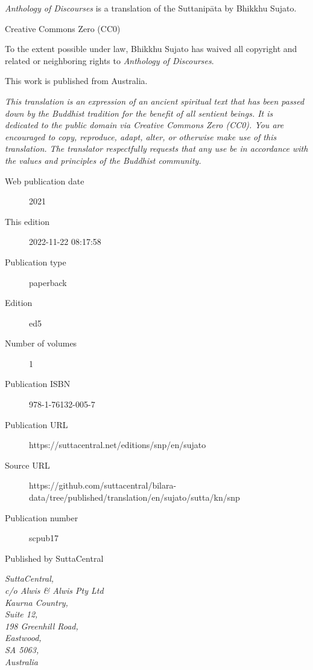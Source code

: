 \documentclass[12pt,openany]{book}%
\begin{document}
\begin{footnotesize}

\textit{Anthology of Discourses} is a translation of the Suttanipāta by Bhikkhu Sujato.

\medskip

Creative Commons Zero (CC0)

To the extent possible under law, Bhikkhu Sujato has waived all copyright and related or neighboring rights to \textit{Anthology of Discourses}.

\medskip

This work is published from Australia.

\begin{center}
\textit{This translation is an expression of an ancient spiritual text that has been passed down by the Buddhist tradition for the benefit of all sentient beings. It is dedicated to the public domain via Creative Commons Zero (CC0). You are encouraged to copy, reproduce, adapt, alter, or otherwise make use of this translation. The translator respectfully requests that any use be in accordance with the values and principles of the Buddhist community.}
\end{center}

\medskip

\begin{description}
    \item[Web publication date] 2021
    \item[This edition] 2022-11-22 08:17:58
    \item[Publication type] paperback
    \item[Edition] ed5
    \item[Number of volumes] 1
    \item[Publication ISBN] 978-1-76132-005-7
    \item[Publication URL] https://suttacentral.net/editions/snp/en/sujato
    \item[Source URL] https://github.com/suttacentral/bilara-data/tree/published/translation/en/sujato/sutta/kn/snp
    \item[Publication number] scpub17
\end{description}

\medskip

Published by SuttaCentral

\medskip

\textit{SuttaCentral,\\
c/o Alwis \& Alwis Pty Ltd\\
Kaurna Country,\\
Suite 12,\\
198 Greenhill Road,\\
Eastwood,\\
SA 5063,\\
Australia}

\end{footnotesize}
\end{document}
